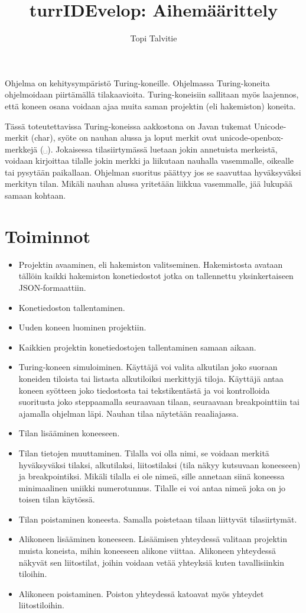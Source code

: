 \documentclass[a4paper, 11pt, finnish]{article}
\author{Topi Talvitie}
\title{turrIDEvelop: Aihemäärittely}
\begin{document}
\maketitle
Ohjelma on kehitysympäristö Turing-koneille. Ohjelmassa Turing-koneita
ohjelmoidaan piirtämällä tilakaavioita. Turing-koneisiin sallitaan myös
laajennos, että koneen osana voidaan ajaa muita saman projektin (eli
hakemiston) koneita.

Tässä toteutettavissa Turing-koneissa aakkostona on Javan tukemat
Unicode-merkit (char), syöte on nauhan alussa ja loput merkit ovat
unicode-openbox-merkkejä (␣). Jokaisessa tilasiirtymässä luetaan jokin
annetuista merkeistä, voidaan kirjoittaa tilalle jokin merkki ja liikutaan
nauhalla vasemmalle, oikealle tai pysytään paikallaan. Ohjelman suoritus
päättyy jos se saavuttaa hyväksyväksi merkityn tilan. Mikäli nauhan alussa
yritetään liikkua vasemmalle, jää lukupää samaan kohtaan.

\section*{Toiminnot}
\begin{itemize}
\item Projektin avaaminen, eli hakemiston valitseminen. Hakemistosta avataan
tällöin kaikki hakemiston konetiedostot jotka on tallennettu yksinkertaiseen
JSON-formaattiin.
\item Konetiedoston tallentaminen.
\item Uuden koneen luominen projektiin.
\item Kaikkien projektin konetiedostojen tallentaminen samaan aikaan.
\item Turing-koneen simuloiminen. Käyttäjä voi valita alkutilan joko suoraan
koneiden tiloista tai listasta alkutiloiksi merkittyjä tiloja.
Käyttäjä antaa koneen syötteen joko tiedostosta tai tekstikentästä ja voi
kontrolloida suoritusta joko steppaamalla seuraavaan tilaan, seuraavaan
breakpointtiin tai ajamalla ohjelman läpi. Nauhan tilaa näytetään reaaliajassa.
\item Tilan lisääminen koneeseen.
\item Tilan tietojen muuttaminen. Tilalla voi olla nimi, se voidaan merkitä
hyväksyväksi tilaksi, alkutilaksi, liitostilaksi (tila näkyy kutsuvaan
koneeseen) ja breakpointiksi. Mikäli tilalla ei ole nimeä, sille annetaan siinä
koneessa minimaalinen uniikki numerotunnus. Tilalle ei voi antaa nimeä joka on
jo toisen tilan käytössä.
\item Tilan poistaminen koneesta. Samalla poistetaan tilaan liittyvät
tilasiirtymät.
\item Alikoneen lisääminen koneeseen. Lisäämisen yhteydessä valitaan projektin
muista koneista, mihin koneeseen alikone viittaa. Alikoneen yhteydessä näkyvät
sen liitostilat, joihin voidaan vetää yhteyksiä kuten tavallisiinkin tiloihin.
\item Alikoneen poistaminen. Poiston yhteydessä katoavat myös yhteydet
liitostiloihin.
\end{itemize}
\end{document}
